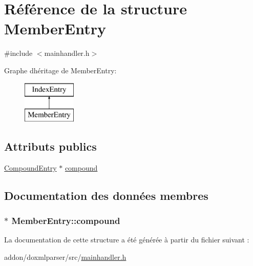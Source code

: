 \hypertarget{struct_member_entry}{}\section{Référence de la structure Member\+Entry}
\label{struct_member_entry}


{\ttfamily \#include $<$mainhandler.\+h$>$}

Graphe d\textquotesingle{}héritage de Member\+Entry\+:\begin{figure}[H]
\begin{center}
\leavevmode
\includegraphics[height=2.000000cm]{struct_member_entry}
\end{center}
\end{figure}
\subsection*{Attributs publics}
\begin{DoxyCompactItemize}
\item 
\hyperlink{struct_compound_entry}{Compound\+Entry} $\ast$ \hyperlink{struct_member_entry_a2932501c3e6ded8652793323cbf6ae2a}{compound}
\end{DoxyCompactItemize}


\subsection{Documentation des données membres}
\hypertarget{struct_member_entry_a2932501c3e6ded8652793323cbf6ae2a}{}
\subsubsection[{compound}]{$\ast$ Member\+Entry\+::compound}\label{struct_member_entry_a2932501c3e6ded8652793323cbf6ae2a}


La documentation de cette structure a été générée à partir du fichier suivant \+:\begin{DoxyCompactItemize}
\item 
addon/doxmlparser/src/\hyperlink{mainhandler_8h}{mainhandler.\+h}\end{DoxyCompactItemize}
